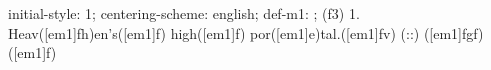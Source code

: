 initial-style: 1;
centering-scheme: english;
def-m1: \grealign;
(f3) 1. Heav([em1]fh)en's([em1]f) high([em1]f) por([em1]e)tal.([em1]fv) (::) ([em1]fgf)([em1]f)